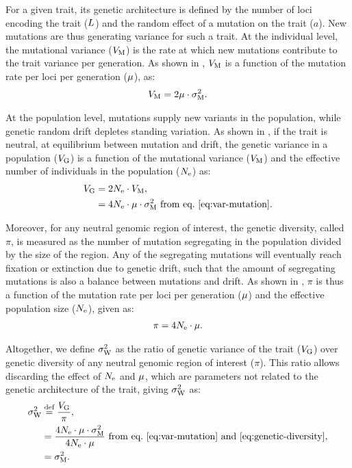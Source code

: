 \documentclass{article}
\begin{document}
For a given trait, its genetic architecture is defined by the number of loci encoding the trait ($L$) and the random effect of a mutation on the trait ($a$).
New mutations are thus generating variance for such a trait.
At the individual level, the mutational variance ($V_{\mathrm{M}}$) is the rate at which new mutations contribute to the trait variance per generation.
As shown in \textcite{lande_quantitative_1979, lande_sexual_1980}, $V_{\mathrm{M}}$ is a function of the mutation rate per loci per generation ($\mu$), as:
\begin{gather}
    V_{\mathrm{M}} = 2 \mu \cdot \sigma^2_{\mathrm{M}} \label{eq:var-mutation}.
\end{gather}

At the population level, mutations supply new variants in the population, while genetic random drift depletes standing variation.
As shown in \textcite{lynch_mutation_1998}, if the trait is neutral, at equilibrium between mutation and drift, the genetic variance in a population ($V_{\mathrm{G}}$) is a function of the mutational variance ($V_{\mathrm{M}}$) and the effective number of individuals in the population ($N_{\text{e}}$) as:
\begin{align}
    V_{\mathrm{G}} & =  2 N_{\text{e}} \cdot V_{\mathrm{M}}, \\
    & = 4 N_{\text{e}} \cdot \mu \cdot \sigma^2_{\mathrm{M}} \text{ from eq.~\ref{eq:var-mutation}}\label{eq:var-genetic}.
\end{align}

Moreover, for any neutral genomic region of interest, the genetic diversity, called $\pi$, is measured as the number of mutation segregating in the population divided by the size of the region.
Any of the segregating mutations will eventually reach fixation or extinction due to genetic drift, such that the amount of segregating mutations is also a balance between mutations and drift.
As shown in \textcite{tajima_statistical_1989}, $\pi$ is thus a function of the mutation rate per loci per generation ($\mu$) and the effective population size ($N_{\text{e}}$), given as:
\begin{gather}
    \pi = 4 N_{\text{e}} \cdot \mu \label{eq:genetic-diversity}.
\end{gather}

Altogether, we define $\sigma^2_{\mathrm{W}}$ as the ratio of genetic variance of the trait ($V_{\mathrm{G}}$) over genetic diversity of any neutral genomic region of interest ($\pi$).
This ratio allows discarding the effect of $N_{\text{e}}$ and $\mu$, which are parameters not related to the genetic architecture of the trait, giving $\sigma^2_{\mathrm{W}}$ as:
\begin{align}
    \sigma^2_{\mathrm{W}} & \stackrel{\text{def}}{=} \frac{V_{\mathrm{G}} }{\pi}, \\
    & = \frac{4 N_{\text{e}} \cdot \mu \cdot \sigma^2_{\mathrm{M}}}{4 N_{\text{e}} \cdot \mu} \text{ from eq.~\ref{eq:var-mutation} and~\ref{eq:genetic-diversity}}, \\
    & = \sigma^2_{\mathrm{M}}. \label{eq:rate-pop}
\end{align}
\end{document}
